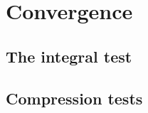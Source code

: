 
\graphicspath{{./chap2/images/}}
\chapter{Convergence}
\section{The integral test}
\section{Compression tests}
